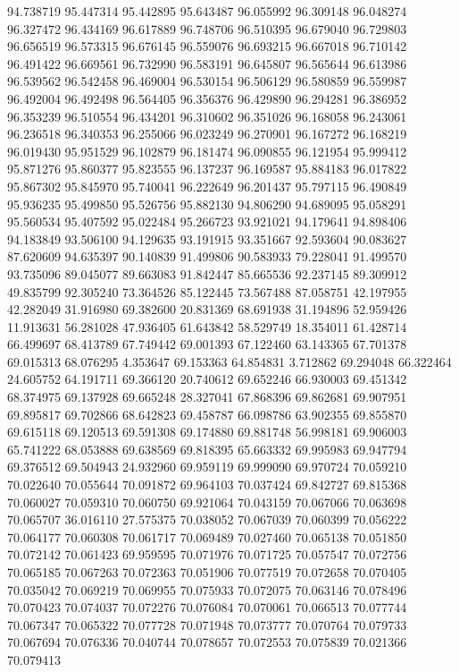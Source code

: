 94.738719
95.447314
95.442895
95.643487
96.055992
96.309148
96.048274
96.327472
96.434169
96.617889
96.748706
96.510395
96.679040
96.729803
96.656519
96.573315
96.676145
96.559076
96.693215
96.667018
96.710142
96.491422
96.669561
96.732990
96.583191
96.645807
96.565644
96.613986
96.539562
96.542458
96.469004
96.530154
96.506129
96.580859
96.559987
96.492004
96.492498
96.564405
96.356376
96.429890
96.294281
96.386952
96.353239
96.510554
96.434201
96.310602
96.351026
96.168058
96.243061
96.236518
96.340353
96.255066
96.023249
96.270901
96.167272
96.168219
96.019430
95.951529
96.102879
96.181474
96.090855
96.121954
95.999412
95.871276
95.860377
95.823555
96.137237
96.169587
95.884183
96.017822
95.867302
95.845970
95.740041
96.222649
96.201437
95.797115
96.490849
95.936235
95.499850
95.526756
95.882130
94.806290
94.689095
95.058291
95.560534
95.407592
95.022484
95.266723
93.921021
94.179641
94.898406
94.183849
93.506100
94.129635
93.191915
93.351667
92.593604
90.083627
87.620609
94.635397
90.140839
91.499806
90.583933
79.228041
91.499570
93.735096
89.045077
89.663083
91.842447
85.665536
92.237145
89.309912
49.835799
92.305240
73.364526
85.122445
73.567488
87.058751
42.197955
42.282049
31.916980
69.382600
20.831369
68.691938
31.194896
52.959426
11.913631
56.281028
47.936405
61.643842
58.529749
18.354011
61.428714
66.499697
68.413789
67.749442
69.001393
67.122460
63.143365
67.701378
69.015313
68.076295
4.353647
69.153363
64.854831
3.712862
69.294048
66.322464
24.605752
64.191711
69.366120
20.740612
69.652246
66.930003
69.451342
68.374975
69.137928
69.665248
28.327041
67.868396
69.862681
69.907951
69.895817
69.702866
68.642823
69.458787
66.098786
63.902355
69.855870
69.615118
69.120513
69.591308
69.174880
69.881748
56.998181
69.906003
65.741222
68.053888
69.638569
69.818395
65.663332
69.995983
69.947794
69.376512
69.504943
24.932960
69.959119
69.999090
69.970724
70.059210
70.022640
70.055644
70.091872
69.964103
70.037424
69.842727
69.815368
70.060027
70.059310
70.060750
69.921064
70.043159
70.067066
70.063698
70.065707
36.016110
27.575375
70.038052
70.067039
70.060399
70.056222
70.064177
70.060308
70.061717
70.069489
70.027460
70.065138
70.051850
70.072142
70.061423
69.959595
70.071976
70.071725
70.057547
70.072756
70.065185
70.067263
70.072363
70.051906
70.077519
70.072658
70.070405
70.035042
70.069219
70.069955
70.075933
70.072075
70.063146
70.078496
70.070423
70.074037
70.072276
70.076084
70.070061
70.066513
70.077744
70.067347
70.065322
70.077728
70.071948
70.073777
70.070764
70.079733
70.067694
70.076336
70.040744
70.078657
70.072553
70.075839
70.021366
70.079413
